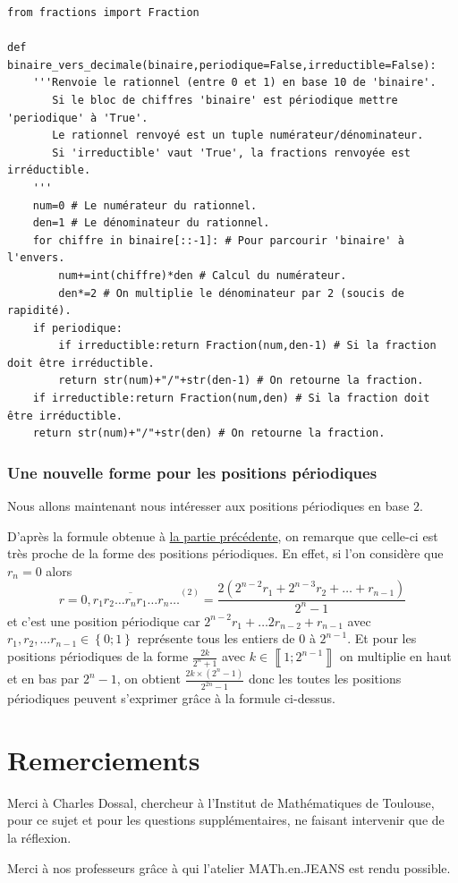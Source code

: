 \documentclass[a4paper,french,12pt]{article}
\begin{document}
\begin{center}
\begin{verbatim}
from fractions import Fraction

def binaire_vers_decimale(binaire,periodique=False,irreductible=False):
    '''Renvoie le rationnel (entre 0 et 1) en base 10 de 'binaire'. 
       Si le bloc de chiffres 'binaire' est périodique mettre 'periodique' à 'True'.
       Le rationnel renvoyé est un tuple numérateur/dénominateur.
       Si 'irreductible' vaut 'True', la fractions renvoyée est irréductible.
    '''
    num=0 # Le numérateur du rationnel.
    den=1 # Le dénominateur du rationnel.
    for chiffre in binaire[::-1]: # Pour parcourir 'binaire' à l'envers.
        num+=int(chiffre)*den # Calcul du numérateur.
        den*=2 # On multiplie le dénominateur par 2 (soucis de rapidité).
    if periodique:
        if irreductible:return Fraction(num,den-1) # Si la fraction doit être irréductible.
        return str(num)+"/"+str(den-1) # On retourne la fraction.
    if irreductible:return Fraction(num,den) # Si la fraction doit être irréductible.
    return str(num)+"/"+str(den) # On retourne la fraction.

\end{verbatim}
\end{center}

\subsubsection{Une nouvelle forme pour les positions périodiques}
Nous allons maintenant nous intéresser aux positions périodiques en base $2$.

D'après la formule obtenue à \hyperlink{11}{la partie précédente}, on remarque que celle-ci est très proche de la forme des positions périodiques. En effet, si l'on considère que $r_n=0$ alors
\[r=\overline{0{,}r_1r_2\ldots r_nr_1\ldots r_n\ldots}^{\left(2\right)}=\frac{2\left(2^{n-2}r_1+2^{n-3}r_2+\ldots+r_{n-1}\right)}{2^n-1}\]
et c'est une position périodique car $2^{n-2}r_1+\ldots2r_{n-2}+r_{n-1}$ avec $r_1,r_2,\ldots r_{n-1}\in\left\{0;1\right\}$ représente tous les entiers de $0$ à $2^{n-1}$. Et pour les positions périodiques de la forme $\frac{2k}{2^n+1}$ avec $k\in\left\llbracket1;2^{n-1}\right\rrbracket$ on multiplie en haut et en bas par $2^n-1$, on obtient $\frac{2k\times\left(2^n-1\right)}{2^{2n}-1}$ donc les toutes les positions périodiques peuvent s'exprimer grâce à la formule ci-dessus.
\section{Remerciements}
Merci à Charles Dossal, chercheur à l’Institut de Mathématiques de Toulouse, pour ce sujet et pour les questions supplémentaires, ne faisant intervenir que de la réflexion.

Merci à nos professeurs grâce à qui l’atelier MATh.en.JEANS est rendu possible.
\end{document}
